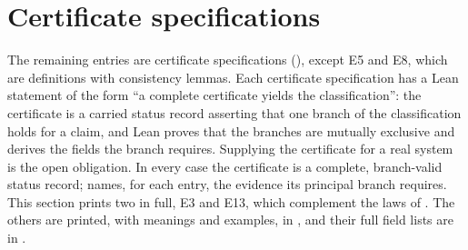 \section{Certificate specifications}\label{sec:templates}

The remaining entries are certificate specifications (), except E5 and E8,
which are definitions with consistency lemmas. Each certificate specification has a Lean statement of
the form ``a complete certificate yields the classification'': the certificate is a
carried status record asserting that one branch of the classification holds for a claim, and Lean
proves that the branches are mutually exclusive and derives the fields the branch requires.
Supplying the certificate for a real system is the open obligation. In every case the certificate
is a complete, branch-valid status record;  names, for each entry, the evidence
its principal branch requires. This section
prints two in full, E3 and E13, which complement the laws of . The
others are printed, with meanings and examples, in , and their full field lists
are in .

